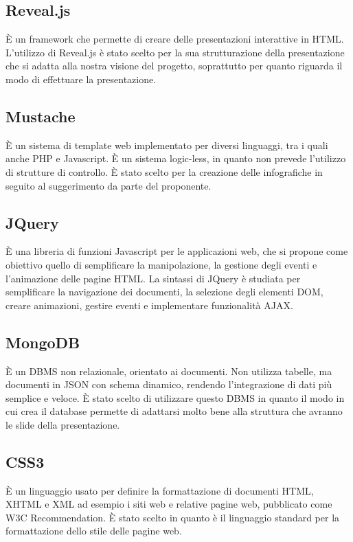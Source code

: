 \subsection{Reveal.js}
È un \gls{framework} che permette di creare delle presentazioni interattive in \gls{HTML}.
L'utilizzo di \gls{Reveal.js} è stato scelto per la sua strutturazione della presentazione che si adatta alla nostra visione del progetto, soprattutto per quanto riguarda il modo di effettuare la presentazione.

\subsection{Mustache}
È un sistema di \gls{template} web implementato per diversi linguaggi, tra i quali anche \gls{PHP} e \gls{Javascript}. È un sistema logic-less, in quanto non prevede l'utilizzo di strutture di controllo.
È stato scelto per la creazione delle \gls{infografiche} in seguito al suggerimento da parte del proponente.

\subsection{JQuery}
È una libreria di funzioni \gls{Javascript} per le applicazioni web, che si propone come obiettivo quello di semplificare la manipolazione, la gestione degli eventi e l'animazione delle pagine \gls{HTML}. La sintassi di \gls{JQuery} è studiata per semplificare la navigazione dei documenti, la selezione degli elementi DOM, creare animazioni, gestire eventi e implementare funzionalità \gls{AJAX}.

\subsection{MongoDB}
È un DBMS non relazionale, orientato ai documenti. Non utilizza tabelle, ma documenti in \gls{JSON} con schema dinamico, rendendo l'integrazione di dati più semplice e veloce.
È stato scelto di utilizzare questo \gls{DBMS} in quanto il modo in cui crea il \gls{database} permette di adattarsi molto bene alla struttura che avranno le \gls{slide} della presentazione.

\subsection{CSS3}
È un linguaggio usato per definire la formattazione di documenti \gls{HTML}, XHTML e XML ad esempio i siti web e relative pagine web, pubblicato come \gls{W3C} Recommendation.
È stato scelto in quanto è il linguaggio standard per la formattazione dello stile delle pagine web.

